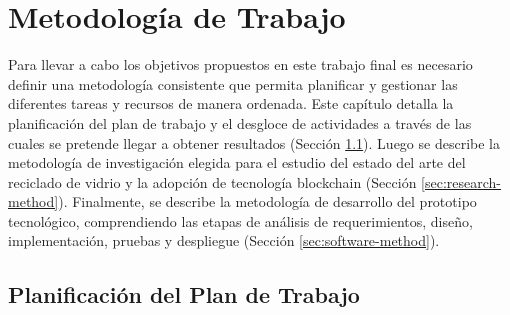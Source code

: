 \chapter[Metodología de Trabajo]{Metodología de Trabajo}
\label{cp:methodology}

\parindent0pt


Para llevar a cabo los objetivos propuestos en este trabajo final es necesario definir una metodología consistente que permita planificar y gestionar las diferentes tareas y recursos de manera ordenada. Este capítulo detalla la planificación del plan de trabajo y el desgloce de actividades a través de las cuales se pretende llegar a obtener resultados (Sección \ref{thesis-plan}). Luego se describe la metodología de investigación elegida para el estudio del estado del arte del reciclado de vidrio y la adopción de tecnología blockchain (Sección \ref{sec:research-method}). Finalmente, se describe la metodología de desarrollo del prototipo tecnológico, comprendiendo las etapas de análisis de requerimientos, diseño, implementación, pruebas y despliegue (Sección \ref{sec:software-method}).

\section{Planificación del Plan de Trabajo}
\label{thesis-plan}

